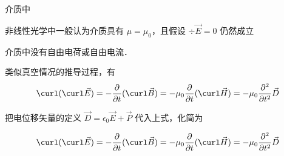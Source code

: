 
介质中

非线性光学中一般认为介质具有 $\mu = \mu_0$，且假设 $\div\vec E = 0$ 仍然成立

介质中没有自由电荷或自由电流．

类似真空情况的推导过程，有
\begin{equation}
\curl(\curl\vec E) = -\frac{\partial}{\partial t} (\curl\vec B) = -\mu_0\frac{\partial}{\partial t} (\curl\vec H)
= -\mu_0\frac{\partial^2}{\partial t^2} \vec D
\end{equation}

把电位移矢量的定义 $\vec D = \epsilon_0\vec E + \vec P$ 代入上式，化简为

\begin{equation}
\curl(\curl\vec E) = -\frac{\partial}{\partial t} (\curl\vec B) = -\mu_0\frac{\partial}{\partial t} (\curl\vec H)
= -\mu_0\frac{\partial^2}{\partial t^2} \vec D
\end{equation}